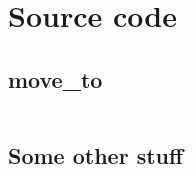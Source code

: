 \documentclass[\rootfolder/main.tex]{subfiles}
\begin{document}
\label{app:sourcecode} %

\chapter{Source code}

\section{move\_to}
\label{app:moveto}

\inputminted[fontsize=\scriptsize]{python}{\rootfolder/Appendices/Listings/move_to.py}

\section{Some other stuff}
\end{document}
